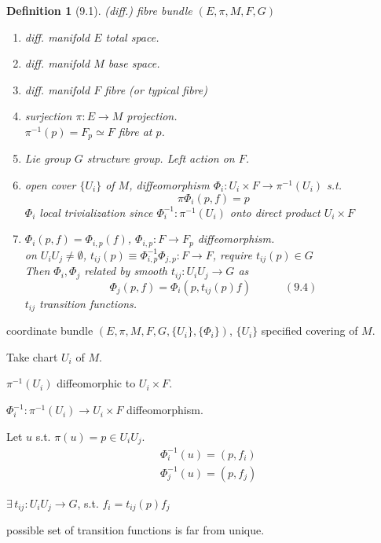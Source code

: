 \documentclass[twoside]{amsart}
\newtheorem{definition}{Definition}
\begin{document}
\begin{definition}[9.1] (diff.) fibre bundle $(E, \pi , M, F , G)$ 
\begin{enumerate}
\item[(i)] diff. manifold $E$ total space.  
\item[(ii)] diff. manifold $M$ base space. 
\item[(iii)] diff. manifold $F$ fibre (or typical fibre)
\item[(iv)] surjection $\pi : E \to M$ projection.  \\
\phantom{surjection} $\pi^{-1}(p) = F_p \simeq F$ fibre at $p$.  
\item[(v)] Lie group $G$ structure group.  Left action on $F$.   
\item[(vi)] open cover $\lbrace U_i \rbrace $ of $M$, diffeomorphism $\Phi_i : U_i \times F \to \pi^{-1}(U_i)$ s.t. 
\[
\pi \Phi_i(p, f) = p 
\]
$\Phi_i$ local trivialization since $\Phi_i^{-1} : \pi^{-1}(U_i)$ onto direct product $U_i \times F$
\item[(vii)]  $\Phi_i(p,f) = \Phi_{i,p}(f)$, $\Phi_{i,p} : F \to F_p$ diffeomorphism.  \\
on $U_i U_j \neq \emptyset$, $t_{ij}(p) \equiv \Phi_{i,p}^{-1} \Phi_{j, p } : F \to F$, require $t_{ij}(p) \in G$ \\
Then $\Phi_i, \Phi_j$ related by smooth $t_{ij} : U_i U_j \to G$ as 
\[
\Phi_j(p,f ) = \Phi_i(p,t_{ij}(p) f ) \quad \quad \quad (9.4)
\]
$t_{ij}$ transition functions.  
\end{enumerate}
\end{definition}

coordinate bundle $(E, \pi, M , F, G, \lbrace U_i \rbrace, \lbrace \Phi_i \rbrace)$, $\lbrace U_i \rbrace$ specified covering of $M$.  

Take chart $U_i$ of $M$.  

$\pi^{-1}(U_i)$ diffeomorphic to $U_i \times F$.  

$\Phi_i^{-1} : \pi^{-1}(U_i) \to U_i \times F$ diffeomorphism.  

Let $u$ s.t. $\pi(u) = p \in U_i U_j$.  
\[
\begin{aligned}
  & \Phi_i^{-1}(u) = ( p , f_i ) \\ 
  & \Phi_j^{-1}(u) = ( p , f_j )
\end{aligned}
\]

$\exists \, t_{ij} : U_i U_j \to G$, s.t. $f_i = t_{ij}(p) f_j$


possible set of transition functions is far from unique.  
\end{document}
